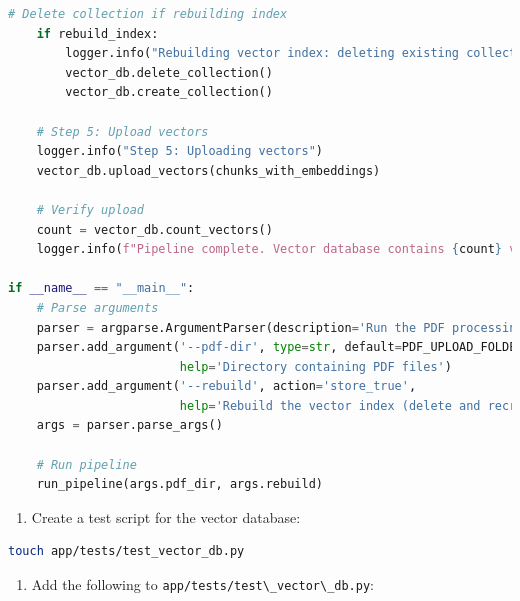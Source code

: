 \documentclass[
  screen,review,acmlarge]{acmart}
\newcommand{\passthrough}[1]{#1}
\providecommand{\tightlist}{%
  \setlength{\itemsep}{0pt}\setlength{\parskip}{0pt}}
\begin{document}
\begin{lstlisting}[language=Python]
    # Delete collection if rebuilding index
    if rebuild_index:
        logger.info("Rebuilding vector index: deleting existing collection")
        vector_db.delete_collection()
        vector_db.create_collection()
    
    # Step 5: Upload vectors
    logger.info("Step 5: Uploading vectors")
    vector_db.upload_vectors(chunks_with_embeddings)
    
    # Verify upload
    count = vector_db.count_vectors()
    logger.info(f"Pipeline complete. Vector database contains {count} vectors")

if __name__ == "__main__":
    # Parse arguments
    parser = argparse.ArgumentParser(description='Run the PDF processing pipeline')
    parser.add_argument('--pdf-dir', type=str, default=PDF_UPLOAD_FOLDER,
                        help='Directory containing PDF files')
    parser.add_argument('--rebuild', action='store_true',
                        help='Rebuild the vector index (delete and recreate)')
    args = parser.parse_args()
    
    # Run pipeline
    run_pipeline(args.pdf_dir, args.rebuild)
\end{lstlisting}

\begin{enumerate}
\def\labelenumi{\arabic{enumi}.}
\setcounter{enumi}{6}
\tightlist
\item
  Create a test script for the vector database:
\end{enumerate}

\begin{lstlisting}[language=bash]
touch app/tests/test_vector_db.py
\end{lstlisting}

\begin{enumerate}
\def\labelenumi{\arabic{enumi}.}
\setcounter{enumi}{7}
\tightlist
\item
  Add the following to \passthrough{\lstinline!app/tests/test\_vector\_db.py!}:
\end{enumerate}
\end{document}
